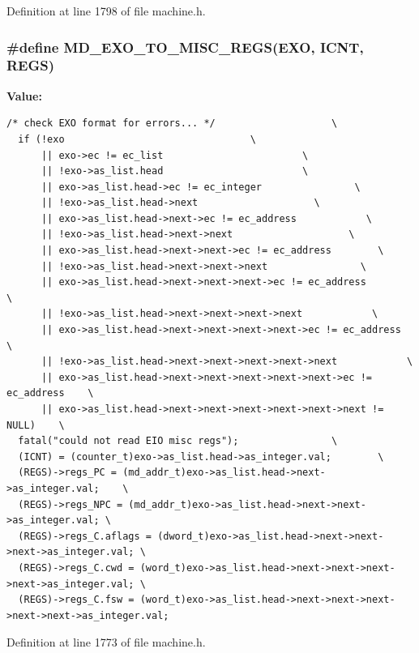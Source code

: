 Definition at line 1798 of file machine.h.
\subsubsection[{MD\_\-EXO\_\-TO\_\-MISC\_\-REGS}]{\setlength{\rightskip}{0pt plus 5cm}\#define MD\_\-EXO\_\-TO\_\-MISC\_\-REGS(EXO, \/  ICNT, \/  REGS)}\label{machine_8h_4e4590cf3e0e070621646417b7104056}


\textbf{Value:}

\begin{Code}\begin{verbatim}/* check EXO format for errors... */                    \
  if (!exo                                \
      || exo->ec != ec_list                        \
      || !exo->as_list.head                        \
      || exo->as_list.head->ec != ec_integer                \
      || !exo->as_list.head->next                    \
      || exo->as_list.head->next->ec != ec_address            \
      || !exo->as_list.head->next->next                    \
      || exo->as_list.head->next->next->ec != ec_address        \
      || !exo->as_list.head->next->next->next                \
      || exo->as_list.head->next->next->next->ec != ec_address        \
      || !exo->as_list.head->next->next->next->next            \
      || exo->as_list.head->next->next->next->next->ec != ec_address    \
      || !exo->as_list.head->next->next->next->next->next            \
      || exo->as_list.head->next->next->next->next->next->ec != ec_address    \
      || exo->as_list.head->next->next->next->next->next->next != NULL)    \
  fatal("could not read EIO misc regs");                \
  (ICNT) = (counter_t)exo->as_list.head->as_integer.val;        \
  (REGS)->regs_PC = (md_addr_t)exo->as_list.head->next->as_integer.val;    \
  (REGS)->regs_NPC = (md_addr_t)exo->as_list.head->next->next->as_integer.val; \
  (REGS)->regs_C.aflags = (dword_t)exo->as_list.head->next->next->next->as_integer.val; \
  (REGS)->regs_C.cwd = (word_t)exo->as_list.head->next->next->next->next->as_integer.val; \
  (REGS)->regs_C.fsw = (word_t)exo->as_list.head->next->next->next->next->next->as_integer.val;
\end{verbatim}
\end{Code}


Definition at line 1773 of file machine.h.
